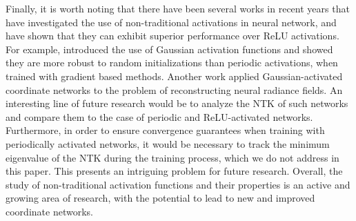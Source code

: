 \documentclass{article}
\theoremstyle{plain}
\theoremstyle{definition}
\theoremstyle{remark}
\begin{document}
Finally, it is worth noting that there have been several works in recent years that have investigated the use of non-traditional activations in neural network, and have shown that they can exhibit superior performance over ReLU activations. For example, \cite{ramasinghe2022beyond} introduced the use of Gaussian activation functions and showed they are more robust to random initializations than periodic activations, when trained with gradient based methods. Another work \cite{chng2022gaussian} applied Gaussian-activated coordinate networks to the problem of reconstructing neural radiance fields. An interesting line of future research would be to analyze the NTK of such networks and compare them to the case of periodic and ReLU-activated networks. Furthermore, in order to ensure convergence guarantees when training with periodically activated networks, it would be necessary to track the minimum eigenvalue of the NTK during the training process, which we do not address in this paper. This presents an intriguing problem for future research. Overall, the study of non-traditional activation functions and their properties is an active and growing area of research, with the potential to lead to new and improved coordinate networks.



\end{document}
